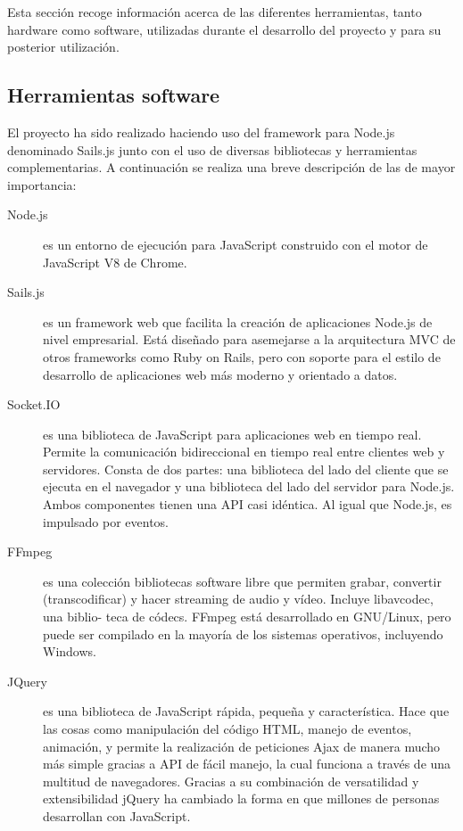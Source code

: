 \documentclass[a4paper,12pt]{article}
\begin{document}
Esta sección recoge información acerca de las diferentes herramientas, tanto hardware como software, utilizadas durante el desarrollo del proyecto y para su posterior utilización. 

\subsection {Herramientas software}

El proyecto ha sido realizado haciendo uso del framework para Node.js denominado Sails.js junto con el uso de diversas bibliotecas y herramientas complementarias. A continuación se realiza una breve descripción de 
las de mayor importancia:\\

\begin{description} 

\item [Node.js] es un entorno de ejecución para JavaScript construido con el motor de JavaScript V8 de Chrome.

\item [Sails.js] es un framework web que facilita la creación de aplicaciones Node.js de nivel empresarial. Está diseñado para asemejarse a la arquitectura MVC de otros frameworks
como Ruby on Rails, pero con soporte para el estilo de desarrollo de aplicaciones web más moderno y orientado a datos.

\item [Socket.IO] es una biblioteca de JavaScript para aplicaciones web en tiempo real. Permite la comunicación bidireccional en tiempo real entre clientes web y servidores. Consta de
dos partes: una biblioteca del lado del cliente que se ejecuta en el navegador y una biblioteca del lado del servidor para Node.js. Ambos componentes tienen una API casi
idéntica. Al igual que Node.js, es impulsado por eventos.

\item [FFmpeg] es una colección bibliotecas software libre que permiten grabar, convertir (transcodificar) y hacer streaming de audio y vídeo. Incluye libavcodec, una biblio-
teca de códecs. FFmpeg está desarrollado en GNU/Linux, pero puede ser compilado en la mayoría de los sistemas operativos, incluyendo Windows.

\item [JQuery] es una biblioteca de JavaScript rápida, pequeña y característica. Hace que las cosas como manipulación del código HTML, manejo de eventos, animación, y permite la realización
de peticiones Ajax de manera mucho más simple gracias a API de fácil manejo, la cual funciona a través de una multitud de navegadores. Gracias a su combinación de versatilidad y extensibilidad 
jQuery ha cambiado la forma en que millones de personas desarrollan con JavaScript.

\end{description}
\end{document}
